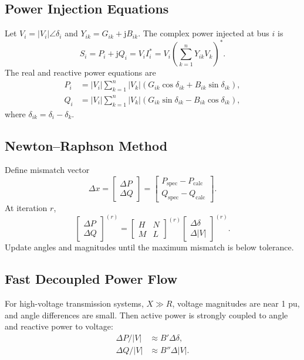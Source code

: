 \documentclass[11pt]{article}
\newcommand{\junit}{\mathrm{j}}
\begin{document}
\subsection{Power Injection Equations}
Let $V_i=|V_i|\angle\delta_i$ and
$Y_{ik}=G_{ik}+\junit B_{ik}$. The complex power injected at bus $i$ is
\begin{equation}
S_i=P_i+\junit Q_i=V_i I_i^*=V_i\left(\sum_{k=1}^{n}Y_{ik}V_k\right)^*.
\end{equation}
The real and reactive power equations are
\begin{align}
P_i &= |V_i|\sum_{k=1}^{n}|V_k|
\left(G_{ik}\cos\delta_{ik}+B_{ik}\sin\delta_{ik}\right),\\
Q_i &= |V_i|\sum_{k=1}^{n}|V_k|
\left(G_{ik}\sin\delta_{ik}-B_{ik}\cos\delta_{ik}\right),
\end{align}
where $\delta_{ik}=\delta_i-\delta_k$.

\subsection{Newton--Raphson Method}
Define mismatch vector
\begin{equation}
\Delta x=
\begin{bmatrix}
\Delta P\\
\Delta Q
\end{bmatrix}
=
\begin{bmatrix}
P_{\mathrm{spec}}-P_{\mathrm{calc}}\\
Q_{\mathrm{spec}}-Q_{\mathrm{calc}}
\end{bmatrix}.
\end{equation}
At iteration $r$,
\begin{equation}
\begin{bmatrix}
\Delta P\\
\Delta Q
\end{bmatrix}^{(r)}
=
\begin{bmatrix}
H & N\\
M & L
\end{bmatrix}^{(r)}
\begin{bmatrix}
\Delta \delta\\
\Delta |V|
\end{bmatrix}^{(r)}.
\end{equation}
Update angles and magnitudes until the maximum mismatch is below tolerance.

\subsection{Fast Decoupled Power Flow}
For high-voltage transmission systems, $X\gg R$, voltage magnitudes are near
1 pu, and angle differences are small. Then active power is strongly coupled to
angle and reactive power to voltage:
\begin{align}
\Delta P/|V| &\approx B'\Delta \delta,\\
\Delta Q/|V| &\approx B''\Delta |V|.
\end{align}
\end{document}
